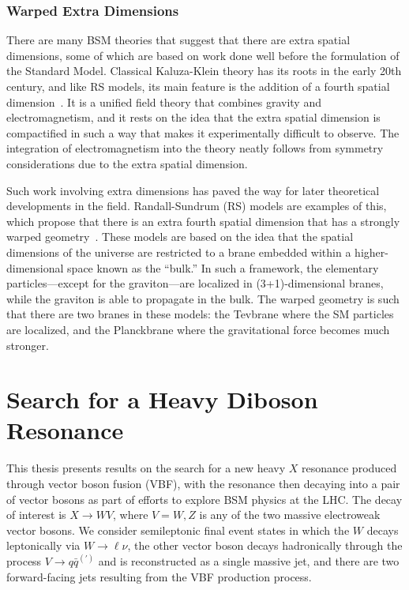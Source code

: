 \subsubsection{Warped Extra Dimensions}

There are many BSM theories that suggest that there are extra spatial dimensions, some of which are based on work done well before the formulation of the Standard Model.
Classical Kaluza-Klein theory has its roots in the early 20th century, and like RS models, its main feature is the addition of a fourth spatial dimension~\cite{1921spaw966K}.
It is a unified field theory that combines gravity and electromagnetism, and it rests on the idea that the extra spatial dimension is compactified in such a way that makes it experimentally difficult to observe.
The integration of electromagnetism into the theory neatly follows from symmetry considerations due to the extra spatial dimension. %

Such work involving extra dimensions has paved the way for later theoretical developments in the field.
Randall-Sundrum (RS) models are examples of this, which propose that there is an extra fourth spatial dimension that has a strongly warped geometry~\cite{PhysRevLett.83.4690}.
These models are based on the idea that the spatial dimensions of the universe are restricted to a brane embedded within a higher-dimensional space known as the ``bulk.''
In such a framework, the elementary particles---except for the graviton---are localized in (3+1)-dimensional branes, while the graviton is able to propagate in the bulk.
The warped geometry is such that there are two branes in these models: the Tevbrane where the SM particles are localized, and the Planckbrane where the gravitational force becomes much stronger.

\section{Search for a Heavy Diboson Resonance}
\label{sec:VBF}

This thesis presents results on the search for a new heavy $X$ resonance produced through vector boson fusion (VBF), with the resonance then decaying into a pair of vector bosons as part of efforts to explore BSM physics at the LHC.
The decay of interest is $X\to WV$, where $V=W,Z$ is any of the two massive electroweak vector bosons.
We consider semileptonic final event states in which the $W$ decays leptonically via $W\to \ell\nu$, the other vector boson decays hadronically through the process $V\to q\bar{q}^{(\prime)}$ and is reconstructed as a single massive jet, and there are two forward-facing jets resulting from the VBF production process.

